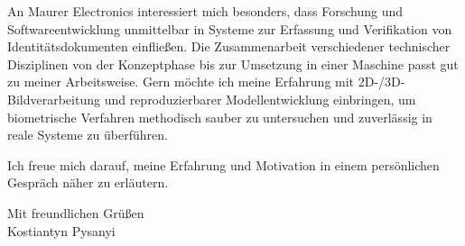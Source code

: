 \documentclass[11pt,a4paper]{article}
\begin{document}
An Maurer Electronics interessiert mich besonders, dass Forschung und Softwareentwicklung unmittelbar in Systeme zur Erfassung und Verifikation von Identitätsdokumenten einfließen. Die Zusammenarbeit verschiedener technischer Disziplinen von der Konzeptphase bis zur Umsetzung in einer Maschine passt gut zu meiner Arbeitsweise. Gern möchte ich meine Erfahrung mit 2D-/3D-Bildverarbeitung und reproduzierbarer Modellentwicklung einbringen, um biometrische Verfahren methodisch sauber zu untersuchen und zuverlässig in reale Systeme zu überführen.

Ich freue mich darauf, meine Erfahrung und Motivation in einem persönlichen Gespräch näher zu erläutern.

Mit freundlichen Grüßen\\[0.8em]
Kostiantyn Pysanyi
\end{document}
